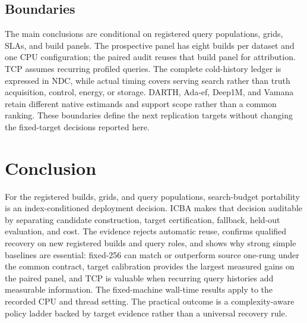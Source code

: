 \subsection{Boundaries}
The main conclusions are conditional on registered query populations, grids, SLAs, and build panels. The prospective panel has eight builds per dataset and one CPU configuration; the paired audit reuses that build panel for attribution. TCP assumes recurring profiled queries. The complete cold-history ledger is expressed in NDC, while actual timing covers serving search rather than truth acquisition, control, energy, or storage. DARTH, Ada-ef, Deep1M, and Vamana retain different native estimands and support scope rather than a common ranking. These boundaries define the next replication targets without changing the fixed-target decisions reported here.

\section{Conclusion}
For the registered builds, grids, and query populations, search-budget portability is an index-conditioned deployment decision. ICBA makes that decision auditable by separating candidate construction, target certification, fallback, held-out evaluation, and cost. The evidence rejects automatic reuse, confirms qualified recovery on new registered builds and query roles, and shows why strong simple baselines are essential: fixed-256 can match or outperform source one-rung under the common contract, target calibration provides the largest measured gains on the paired panel, and TCP is valuable when recurring query histories add measurable information. The fixed-machine wall-time results apply to the recorded CPU and thread setting. The practical outcome is a complexity-aware policy ladder backed by target evidence rather than a universal recovery rule.
